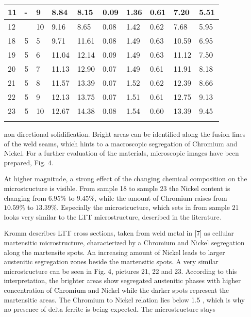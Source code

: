 \documentclass[10pt]{article}
\begin{document}
\begin{center}
\begin{tabular}{l|l|l|l|l|l|l|l|l|l}
\hline
11 & - & 9 & 8.84 & 8.15 & 0.09 & 1.36 & 0.61 & 7.20 & 5.51 \\
\hline
12 &  & 10 & 9.16 & 8.65 & 0.08 & 1.42 & 0.62 & 7.68 & 5.95 \\
\hline
18 & 5 & 5 & 9.71 & 11.61 & 0.08 & 1.49 & 0.63 & 10.59 & 6.95 \\
\hline
19 & 5 & 6 & 11.04 & 12.14 & 0.09 & 1.49 & 0.63 & 11.12 & 7.50 \\
\hline
20 & 5 & 7 & 11.13 & 12.90 & 0.07 & 1.49 & 0.61 & 11.91 & 8.18 \\
\hline
21 & 5 & 8 & 11.57 & 13.39 & 0.07 & 1.52 & 0.62 & 12.39 & 8.66 \\
\hline
22 & 5 & 9 & 12.13 & 13.75 & 0.07 & 1.51 & 0.61 & 12.75 & 9.13 \\
\hline
23 & 5 & 10 & 12.67 & 14.38 & 0.08 & 1.54 & 0.60 & 13.39 & 9.45 \\
\hline
 &  &  &  &  &  &  &  &  &  \\
\hline
\end{tabular}
\end{center}

non-directional solidification. Bright areas can be identified along the fusion lines of the weld seams, which hints to a macroscopic segregation of Chromium and Nickel. For a further evaluation of the materials, microscopic images have been prepared, Fig. 4.

At higher magnitude, a strong effect of the changing chemical composition on the microstructure is visible. From sample 18 to sample 23 the Nickel content is changing from $6.95 \%$ to $9.45 \%$, while the amount of Chromium raises from $10.59 \%$ to $13.39 \%$. Especially the microstructure, which sets in from sample 21 looks very similar to the LTT microstructure, described in the literature.

Kromm describes LTT cross sections, taken from weld metal in [7] as cellular martensitic microstructure, characterized by a Chromium and Nickel segregation along the martensite spots. An increasing amount of Nickel leads to larger austenitic segregation zones beside the martensitic spots. A very similar microstructure can be seen in Fig. 4, pictures 21, 22 and 23. According to this interpretation, the brighter areas show segregated austenitic phases with higher concentration of Chromium and Nickel while the darker spots represent the martensitic areas. The Chromium to Nickel relation lies below 1.5 , which is why no presence of delta ferrite is being expected. The microstructure stays
\end{document}
